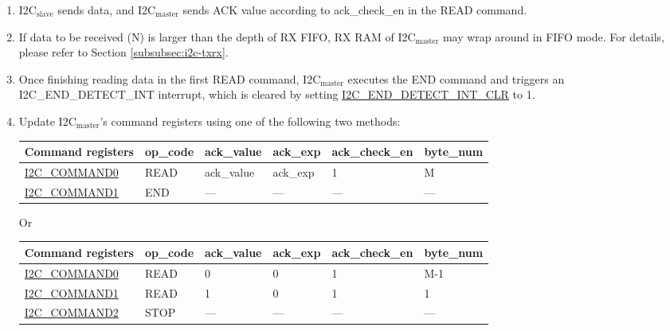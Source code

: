 \documentclass[main\_\_EN.tex]{subfiles}
\begin{document}
\begin{enumerate}
\item I2C$_\text{slave}$ sends data, and I2C$_\text{master}$ sends ACK value according to ack\_check\_en in the READ command.

\item If data to be received (N) is larger than the depth of RX FIFO, RX RAM of I2C$_\text{master}$ may wrap around in FIFO mode. For details, please refer to Section \ref{subsubsec:i2c-txrx}.

\item Once finishing reading data in the first READ command, I2C$_\text{master}$ executes the END command and triggers an I2C\_END\_DETECT\_INT interrupt, which is cleared by setting \hyperref[fielddesc:I2CENDDETECTINTCLR]{I2C\_END\_DETECT\_INT\_CLR} to 1.
\item Update I2C$_\text{master}$'s command registers using one of the following two methods:
\begin{longtable}{ | p{4cm} | p{2cm} | p{2cm} | p{2cm} |p{2cm} | p{2cm} |}
\hline\rowcolor{lightgray}
Command registers & op\_code & ack\_value&ack\_exp&ack\_check\_en&byte\_num  \\ \hline
\hyperref[fielddesc:I2CCOMMAND0]{I2C\_COMMAND0} & READ& ack\_value&ack\_exp&1&M  \\ \hline
\hyperref[fielddesc:I2CCOMMAND1]{I2C\_COMMAND1} & END& ---&---&---&---  \\ \hline
\end{longtable}
Or
\begin{longtable}{ | p{4cm} | p{2cm} | p{2cm} | p{2cm} |p{2cm} | p{2cm} |}
\hline\rowcolor{lightgray}
Command registers & op\_code & ack\_value&ack\_exp&ack\_check\_en&byte\_num  \\ \hline
\hyperref[fielddesc:I2CCOMMAND0]{I2C\_COMMAND0} & READ& 0&0&1&M-1  \\ \hline
\hyperref[fielddesc:I2CCOMMAND1]{I2C\_COMMAND1} & READ& 1&0&1&1  \\ \hline
\hyperref[fielddesc:I2CCOMMAND2]{I2C\_COMMAND2} & STOP& ---&---&---&---  \\ \hline
\end{longtable}



\end{enumerate}
\end{document}
